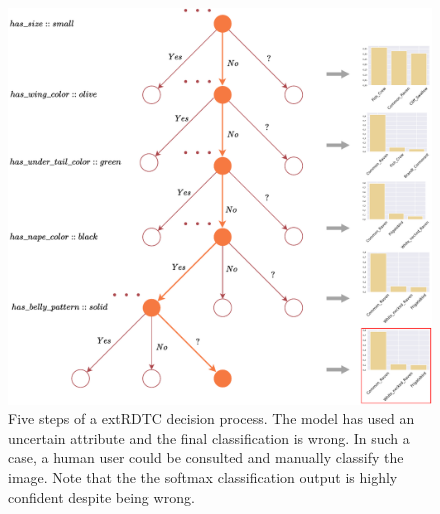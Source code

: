 \documentclass[a4paper,cleardoubleempty,BCOR1cm, 11pt]{report}
\begin{document}
\begin{figure}[t]
	\centering
	\includegraphics[width=1\textwidth]{images/example_tree.pdf}
	\caption{Five steps of a extRDTC decision process. The model has used an uncertain attribute and the final classification is wrong. In such a case, a human user could be consulted and manually classify the image. Note that the the softmax classification output is highly confident despite being wrong.}
	\label{fig:example_tree}
\end{figure}
\end{document}
